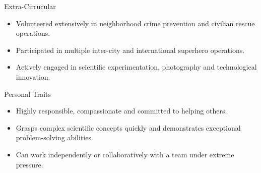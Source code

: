 \documentclass{resume}
\begin{document}
\begin{rSection}{Extra-Cirrucular} \itemsep -3pt

\begin{itemize} 
		\item Volunteered extensively in neighborhood crime prevention and civilian rescue operations.
		\item Participated in multiple inter-city and international superhero operations.
		\item Actively engaged in scientific experimentation, photography and technological innovation.
\end{itemize}

\end{rSection}

\begin{rSection}{Personal Traits}

\begin{itemize} 
		\item Highly responsible, compassionate and committed to helping others.
		\item  Grasps complex scientific concepts quickly and demonstrates exceptional problem-solving abilities.
		\item Can work independently or collaboratively with a team under extreme pressure.
\end{itemize}
\end{rSection}
\end{document}
